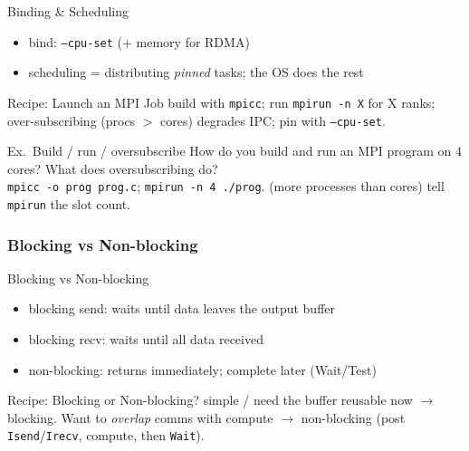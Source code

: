 \begin{concept}{Binding \& Scheduling}
    \begin{itemize}
        \item bind: \texttt{--cpu-set} (+ memory for RDMA)
        \item scheduling = distributing \emph{pinned} tasks; the OS does the rest
    \end{itemize}
\end{concept}

\multend

\begin{KR}{Recipe: Launch an MPI Job}
    build with \texttt{mpicc}; run \texttt{mpirun -n X} for X ranks; over-subscribing (procs $>$ cores) degrades IPC; pin with \texttt{--cpu-set}.
\end{KR}

\begin{example2}{Ex.\ Build / run / oversubscribe}
    How do you build and run an MPI program on 4 cores? What does oversubscribing do?
     \\ 
    \texttt{mpicc -o prog prog.c}; \texttt{mpirun -n 4 ./prog}.  (more processes than cores)  tell \texttt{mpirun} the slot count.
\end{example2}

\subsubsection{Blocking vs Non-blocking}


\begin{definition}{Blocking vs Non-blocking}
    \begin{itemize}
        \item blocking send: waits until data leaves the output buffer
        \item blocking recv: waits until all data received
        \item non-blocking: returns immediately; complete later (Wait/Test)
    \end{itemize}
\end{definition}

\begin{KR}{Recipe: Blocking or Non-blocking?}
    simple / need the buffer reusable now $\to$ blocking. Want to \emph{overlap} comms with compute $\to$ non-blocking (post \texttt{Isend}/\texttt{Irecv}, compute, then \texttt{Wait}).
\end{KR}

